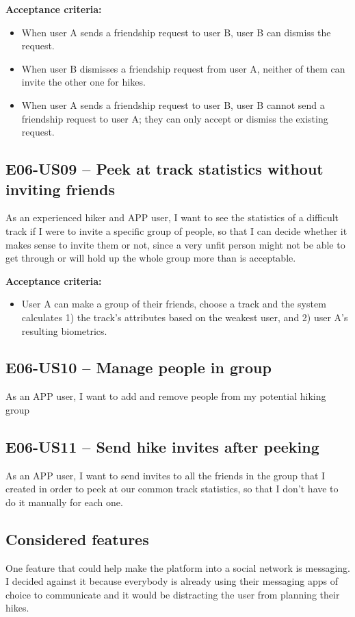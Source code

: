 \textbf{Acceptance criteria:}
\begin{itemize}
    \item When user A sends a friendship request to user B, user B can dismiss the request.
    \item When user B dismisses a friendship request from user A, neither of them can invite the other one for hikes.
    \item When user A sends a friendship request to user B, user B cannot send a friendship request to user A; they can only accept or dismiss the existing request.
\end{itemize}



\subsection*{E06-US09 -- Peek at track statistics without inviting friends}
As an experienced hiker and APP user, I want to see the statistics of a difficult track if I were to invite a specific group of people,
so that I can decide whether it makes sense to invite them or not, since a very unfit person might not be able to get through or will hold up the whole group more than is acceptable.

\textbf{Acceptance criteria:}
\begin{itemize}
    \item User A can make a group of their friends, choose a track and the system calculates 1) the track's attributes based on the weakest user, and 2) user A's resulting biometrics.
\end{itemize}

\subsection*{E06-US10 -- Manage people in group}
As an APP user, I want to add and remove people from my potential hiking group 

\subsection*{E06-US11 -- Send hike invites after peeking}
As an APP user, I want to send invites to all the friends in the group that I created in order to peek at our common track statistics, so that I don't have to do it manually for each one.



\subsection*{Considered features}
One feature that could help make the platform into a social network is messaging.
I decided against it because everybody is already using their messaging apps of choice to communicate and it would be distracting the user from planning their hikes.


